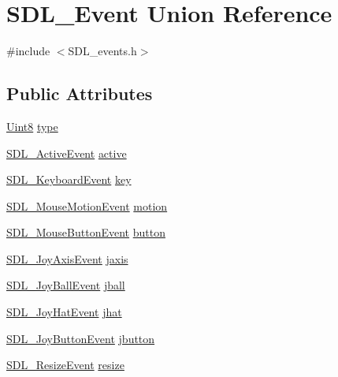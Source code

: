 \hypertarget{union_s_d_l___event}{}\section{S\+D\+L\+\_\+\+Event Union Reference}
\label{union_s_d_l___event}


{\ttfamily \#include $<$S\+D\+L\+\_\+events.\+h$>$}

\subsection*{Public Attributes}
\begin{DoxyCompactItemize}
\item 
\hyperlink{_s_d_l__stdinc_8h_a2944638813a090aa23e62f4da842c3e2}{Uint8} \hyperlink{union_s_d_l___event_a166d8d0350220f28bef35a7b4a8c6900}{type}
\item 
\hyperlink{struct_s_d_l___active_event}{S\+D\+L\+\_\+\+Active\+Event} \hyperlink{union_s_d_l___event_ab8b2b899275fb4116ec85ae5a926b23d}{active}
\item 
\hyperlink{struct_s_d_l___keyboard_event}{S\+D\+L\+\_\+\+Keyboard\+Event} \hyperlink{union_s_d_l___event_ab99927835cc77a9b6bb50b419b4a27df}{key}
\item 
\hyperlink{struct_s_d_l___mouse_motion_event}{S\+D\+L\+\_\+\+Mouse\+Motion\+Event} \hyperlink{union_s_d_l___event_ac3c89e190faacbe84280cd539453bab6}{motion}
\item 
\hyperlink{struct_s_d_l___mouse_button_event}{S\+D\+L\+\_\+\+Mouse\+Button\+Event} \hyperlink{union_s_d_l___event_ab6da2fa2687e5f849f270adecc64785f}{button}
\item 
\hyperlink{struct_s_d_l___joy_axis_event}{S\+D\+L\+\_\+\+Joy\+Axis\+Event} \hyperlink{union_s_d_l___event_ac4611acd0e9c675e67dc20919f0accb4}{jaxis}
\item 
\hyperlink{struct_s_d_l___joy_ball_event}{S\+D\+L\+\_\+\+Joy\+Ball\+Event} \hyperlink{union_s_d_l___event_ae433f511e3383d17f8fe02df745ee8f8}{jball}
\item 
\hyperlink{struct_s_d_l___joy_hat_event}{S\+D\+L\+\_\+\+Joy\+Hat\+Event} \hyperlink{union_s_d_l___event_a421b40e0f8e01f181c8d5548cff1dd1d}{jhat}
\item 
\hyperlink{struct_s_d_l___joy_button_event}{S\+D\+L\+\_\+\+Joy\+Button\+Event} \hyperlink{union_s_d_l___event_a591104d64903ae1cf70874fb5d3124ff}{jbutton}
\item 
\hyperlink{struct_s_d_l___resize_event}{S\+D\+L\+\_\+\+Resize\+Event} \hyperlink{union_s_d_l___event_a6e82d8628b9402aaa7660ebf0162228a}{resize}

\end{DoxyCompactItemize}
